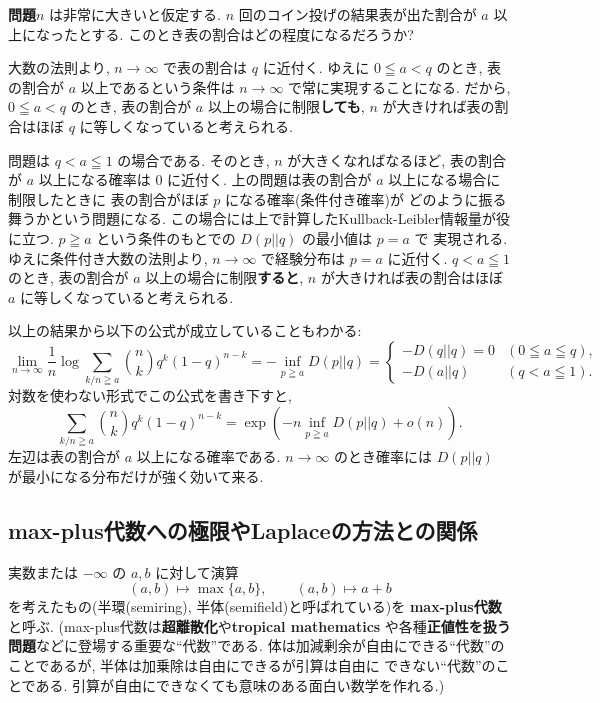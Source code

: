 \documentclass[12pt,twoside]{jarticle}
\theoremstyle{jplain}
\theoremstyle{jplain}
\theoremstyle{jplain}
\numberwithin{theorem}{section}
\numberwithin{equation}{section}
\numberwithin{figure}{section}
\numberwithin{table}{section}
\begin{document}
\medskip

{\bf 問題}\enspace $n$ は非常に大きいと仮定する.
$n$ 回のコイン投げの結果表が出た割合が $a$ 以上になったとする.
このとき表の割合はどの程度になるだろうか?

\medskip

大数の法則より, $n\to\infty$ で表の割合は $q$ に近付く.
ゆえに $0\leqq a<q$ のとき, 表の割合が $a$ 以上であるという条件は
$n\to\infty$ で常に実現することになる.
だから, $0\leqq a<q$ のとき, 表の割合が $a$ 以上の場合に制限{\bf しても}, 
$n$ が大きければ表の割合はほぼ $q$ に等しくなっていると考えられる.

問題は $q<a\leqq 1$ の場合である. 
そのとき, $n$ が大きくなればなるほど, 
表の割合が $a$ 以上になる確率は $0$ に近付く.  
上の問題は表の割合が $a$ 以上になる場合に制限したときに
表の割合がほぼ $p$ になる確率(条件付き確率)が
どのように振る舞うかという問題になる.
この場合には上で計算したKullback-Leibler情報量が役に立つ.
$p\geqq a$ という条件のもとでの $D(p||q)$ の最小値は $p=a$ で
実現される. ゆえに条件付き大数の法則より, 
$n\to\infty$ で経験分布は $p=a$ に近付く.
$q<a\leqq 1$ のとき, 表の割合が $a$ 以上の場合に制限{\bf すると}, 
$n$ が大きければ表の割合はほぼ $a$ に等しくなっていると考えられる.

以上の結果から以下の公式が成立していることもわかる:
\[
\lim_{n\to\infty}
\frac{1}{n}\log\sum_{k/n\geqq a} \binom{n}{k}q^k(1-q)^{n-k}
=-\inf_{p\geqq a} D(p||q)
=
\begin{cases}
-D(q||q)=0 & (0\leqq a\leqq q), \\
-D(a||q)   & (q<a\leqq 1).
\end{cases}
\]
対数を使わない形式でこの公式を書き下すと,
\[
\sum_{k/n\geqq a} \binom{n}{k}q^k(1-q)^{n-k}
=
\exp\left(-n\inf_{p\geqq a}D(p||q) + o(n)\right).
\]
左辺は表の割合が $a$ 以上になる確率である.
$n\to\infty$ のとき確率には $D(p||q)$ が最小になる分布だけが強く効いて来る.



\subsection{max-plus代数への極限やLaplaceの方法との関係}

実数または $-\infty$ の $a,b$ に対して演算
\[
(a,b)\mapsto\max\{a,b\}, \qquad
(a,b)\mapsto a+b
\]
を考えたもの(半環(semiring), 半体(semifield)と呼ばれている)を
{\bf max-plus代数}と呼ぶ.
(max-plus代数は{\bf 超離散化}や{\bf tropical mathematics} 
や各種{\bf 正値性を扱う問題}などに登場する重要な``代数''である. 
体は加減剰余が自由にできる``代数''のことであるが, 
半体は加乗除は自由にできるが引算は自由に
できない``代数''のことである.
引算が自由にできなくても意味のある面白い数学を作れる.)
\end{document}

